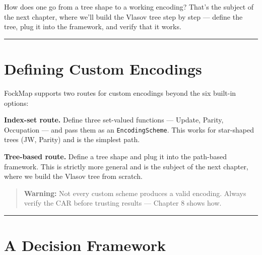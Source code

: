 \documentclass[
  11pt,
  oneside]{book}
\begin{document}
How does one go from a tree shape to a working encoding? That's the
subject of the next chapter, where we'll build the Vlasov tree step by
step --- define the tree, plug it into the framework, and verify that it
works.

\begin{center}\rule{0.5\linewidth}{0.5pt}\end{center}

\section{Defining Custom Encodings}\label{defining-custom-encodings}

FockMap supports two routes for custom encodings beyond the six built-in
options:

\textbf{Index-set route.} Define three set-valued functions --- Update,
Parity, Occupation --- and pass them as an \texttt{EncodingScheme}. This
works for star-shaped trees (JW, Parity) and is the simplest path.

\textbf{Tree-based route.} Define a tree shape and plug it into the
path-based framework. This is strictly more general and is the subject
of the next chapter, where we build the Vlasov tree from scratch.

\begin{quote}
\textbf{Warning:} Not every custom scheme produces a valid encoding.
Always verify the CAR before trusting results --- Chapter 8 shows how.
\end{quote}

\begin{center}\rule{0.5\linewidth}{0.5pt}\end{center}

\section{A Decision Framework}\label{a-decision-framework}
\end{document}
